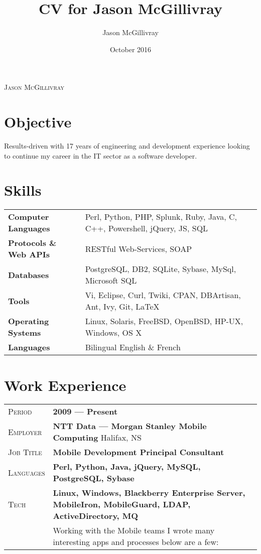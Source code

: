 \documentclass[a4paper, oneside, final]{scrartcl}
\title{CV for Jason McGillivray}
\author{Jason McGillivray}
\date {October 2016}
\newcommand{\gray}{\rowcolor[gray]{.90}}
\begin{document}
\begin{center} %


{\fontsize{20}{20}\selectfont\scshape Jason McGillivray} %

\vspace{.3cm} %


\section{Objective}
Results-driven with 17 years of engineering and development experience looking to continue my career in the IT sector as a software developer.


\section{Skills}

\begin{tabular}{ @{} >{\bfseries}l @{\hspace{6ex}} l }
Computer Languages & Perl, Python, PHP, Splunk, Ruby, Java, C, C++, Powershell, jQuery, JS, SQL \\
Protocols \& Web APIs & RESTful Web-Services, SOAP\\
Databases & PostgreSQL, DB2, SQLite, Sybase, MySql, Microsoft SQL \\
Tools & Vi, Eclipse, Curl, Twiki, CPAN, DBArtisan, Ant, Ivy, Git, LaTeX\\
Operating Systems & Linux, Solaris, FreeBSD, OpenBSD, HP-UX, Windows, OS X\\
Languages & Bilingual English \& French\\
\end{tabular}


\section{Work Experience}

\begin{tabularx}{0.97\linewidth}{>{\raggedleft\scshape}p{2cm}X}
\gray Period & \textbf{2009 --- Present}\\
\gray Employer & \textbf{NTT Data --- Morgan Stanley Mobile Computing} \hfill Halifax, NS\\
\gray Job Title & \textbf{Mobile Development Principal Consultant}\\
\gray Languages & \textbf{Perl, Python, Java, jQuery, MySQL, PostgreSQL, Sybase}\\
\gray Tech & \textbf{Linux, Windows, Blackberry Enterprise Server, MobileIron, MobileGuard, LDAP, ActiveDirectory, MQ}\\
& Working with the Mobile teams I wrote many interesting apps and processes below are a few:


\end{tabularx}
\end{center}
\end{document}
